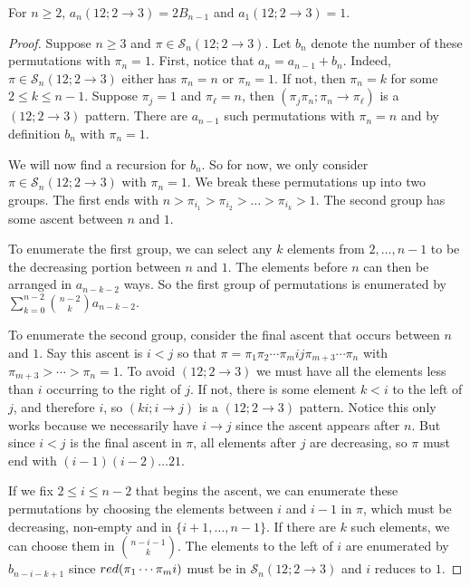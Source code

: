 \documentclass[10pt,a4paper]{amsart}
\renewcommand\S{\mathcal S}
\begin{document}
\begin{theorem} \label{thm:12t23}
    For $n \geq 2$, $a_n(12; 2 \to 3) = 2B_{n-1}$ and $a_1(12; 2 \to 3) = 1$.
\end{theorem}

\begin{proof}
    Suppose $n \geq 3$ and $\pi \in \S_n(12; 2 \to 3)$. Let $b_n$ denote the number of these permutations with $\pi_n = 1$. First, notice that $a_n = a_{n-1} + b_n$. Indeed, $\pi \in \S_n(12; 2 \to 3)$ either has $\pi_n = n$ or $\pi_n = 1$. If not, then $\pi_n = k$ for some $2 \leq k \leq n-1$. Suppose $\pi_j = 1$ and $\pi_\ell = n$, then $(\pi_j\pi_n;\pi_n \to \pi_\ell)$ is a $(12; 2 \to 3)$ pattern. There are $a_{n-1}$ such permutations with $\pi_n = n$ and by definition $b_n$ with $\pi_n = 1$.

    We will now find a recursion for $b_n$. So for now, we only consider $\pi \in \S_n(12;2\to3)$ with $\pi_n = 1$. We break these permutations up into two groups. The first ends with $n > \pi_{i_1} > \pi_{i_2}> \ldots > \pi_{i_k} > 1$. The second group has some ascent between $n$ and $1$. 

    To enumerate the first group, we can select any $k$ elements from $2,\dots,n-1$ to be the decreasing portion between $n$ and $1$. The elements before $n$ can then be arranged in $a_{n-k-2}$ ways. So the first group of permutations is enumerated by $\sum_{k=0}^{n-2} \binom{n-2}{k} a_{n-k-2}$.

    To enumerate the second group, consider the final ascent that occurs between $n$ and $1$. Say this ascent is $i < j$ so that $\pi = \pi_1 \pi_2 \cdots \pi_m ij \pi_{m+3} \cdots \pi_n$ with $\pi_{m+3} > \cdots > \pi_n = 1.$ To avoid $(12;2\to3)$ we must have all the elements less than $i$ occurring to the right of $j$. If not, there is some element $k < i$ to the left of $j$, and therefore $i$, so $(ki; i \to j)$ is a $(12; 2\to 3)$ pattern. Notice this only works because we necessarily have $i \to j$ since the ascent appears after $n$. But since $i < j$ is the final ascent in $\pi$, all elements after $j$ are decreasing, so $\pi$ must end with $(i-1)(i-2)\ldots21$.
    
    If we fix $2 \leq i \leq n-2$ that begins the ascent, we can enumerate these permutations by choosing the elements between $i$ and $i-1$ in $\pi$, which must be decreasing, non-empty and in $\{i+1,\dots,n-1\}$. If there are $k$ such elements, we can choose them in $\binom{n-i-1}{k}$. The elements to the left of $i$ are enumerated by $b_{n-i-k+1}$ since ${\rm red}(\pi_1 \cdots \pi_m i)$ must be in $\S_n(12; 2\to3)$ and  $i$ reduces to $1$.
    

\end{proof}
\end{document}
